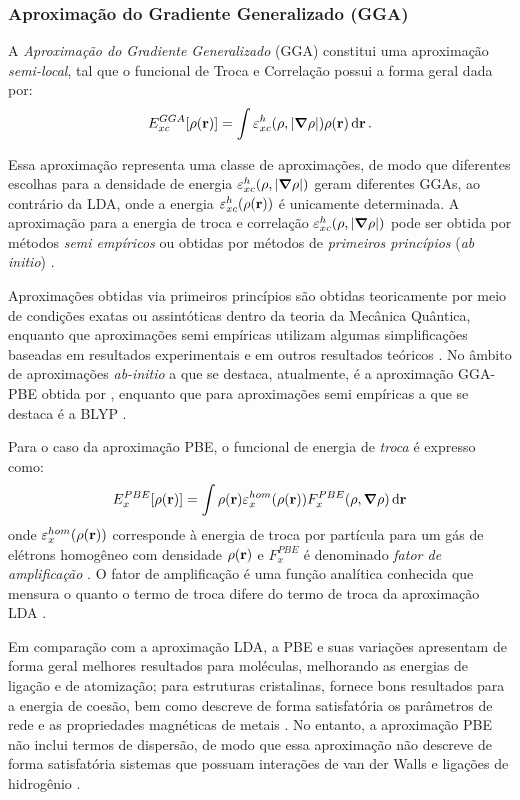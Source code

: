 \subsubsection{Aproximação do Gradiente Generalizado (GGA)}


A \textit{ Aproximação do Gradiente Generalizado} (GGA) constitui uma aproximação \textit{semi-local}, tal que o funcional de Troca e Correlação possui a forma geral dada por:
\begin{equation}
	E_{xc}^{GGA}\bqty{\dens}= \int\varepsilon_{xc}^{h}\pqty{\rho,\abs{\grad{\rho}}}\dens\dr.
\end{equation}


Essa aproximação representa uma classe de aproximações, de modo que diferentes escolhas para a densidade de energia $ \varepsilon_{xc}^{h}\pqty{\rho,\abs{\grad{\rho}}}$ geram diferentes GGAs, ao contrário da LDA, onde a energia $ \varepsilon_{xc}^{h}\pqty{\dens} $ é unicamente determinada. A aproximação para a energia de troca e correlação  $ \varepsilon_{xc}^{h}\pqty{\rho,\abs{\grad{\rho}}} $ pode ser obtida por métodos \textit{semi empíricos} ou obtidas por métodos de \textit{primeiros princípios} (\textit{ab initio}) \cite{capelle}.


Aproximações obtidas via primeiros princípios são obtidas teoricamente por meio de condições exatas ou assintóticas dentro da teoria da Mecânica Quântica, enquanto que aproximações semi empíricas utilizam algumas simplificações baseadas em resultados experimentais e em outros resultados teóricos \cite{rev_dft}. No âmbito de aproximações \textit{ab-initio} a que se destaca, atualmente, é a aproximação GGA-PBE obtida por \citeauthor{PBE}, enquanto que para aproximações semi empíricas a que se destaca é a BLYP \cite{blyp_b,blyp_b-2}. 

Para o caso da aproximação PBE, o funcional de energia de \textit{troca} é expresso como:
\begin{equation}
	E^{PBE}_{x}\bqty{\dens}=\int \dens \varepsilon_{x}^{hom}(\dens)F^{PBE}_x(\rho,\grad{\rho})\dr
\end{equation}
onde $ \varepsilon_{x}^{hom}(\rho(\vb{r})) $ corresponde à energia de troca por partícula para um gás de elétrons homogêneo com densidade $ \rho(\vb{r}) $ e $ F^{PBE}_x $ é denominado \textit{fator de amplificação} \cite{rev_dft}. O fator de amplificação é uma função analítica conhecida que mensura o quanto o termo de troca difere do termo de troca da aproximação LDA \cite{abc_dft}. 

Em comparação com a aproximação LDA, a PBE e suas variações apresentam de forma geral melhores resultados para moléculas, melhorando as energias de ligação e de atomização; para estruturas cristalinas, fornece bons resultados para a energia de coesão, bem como descreve de forma satisfatória os parâmetros de rede e as propriedades magnéticas de metais \cite{rev_dft}. No entanto, a aproximação PBE não inclui termos de dispersão, de modo que essa aproximação não descreve de forma satisfatória sistemas que possuam interações de van der Walls e ligações de hidrogênio \cite{vdw_solidos}. 

